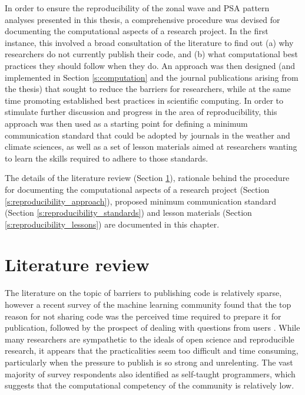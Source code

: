 In order to ensure the reproducibility of the zonal wave and PSA pattern analyses presented in this thesis, a comprehensive procedure was devised for documenting the computational aspects of a research project. In the first instance, this involved a broad consultation of the literature to find out (a) why researchers do not currently publish their code, and (b) what computational best practices they should follow when they do. An approach was then designed (and implemented in Section \ref{s:computation} and the journal publications arising from the thesis) that sought to reduce the barriers for researchers, while at the same time promoting established best practices in scientific computing. In order to stimulate further discussion and progress in the area of reproducibility, this approach was then used as a starting point for defining a minimum communication standard that could be adopted by journals in the weather and climate sciences, as well as a set of lesson materials aimed at researchers wanting to learn the skills required to adhere to those standards. 

The details of the literature review (Section \ref{s:reproducibility_review}), rationale behind the procedure for documenting the computational aspects of a research project (Section \ref{s:reproducibility_approach}), proposed minimum communication standard (Section \ref{s:reproducibility_standards}) and lesson materials (Section \ref{s:reproducibility_lessons}) are documented in this chapter.



\section{Literature review}\label{s:reproducibility_review}

The literature on the topic of barriers to publishing code is relatively sparse, however a recent survey of the machine learning community found that the top reason for not sharing code was the perceived time required to prepare it for publication, followed by the prospect of dealing with questions from users \citep{Stodden2010}. While many researchers are sympathetic to the ideals of open science and reproducible research, it appears that the practicalities seem too difficult and time consuming, particularly when the pressure to publish is so strong and unrelenting. The vast majority of survey respondents also identified as self-taught programmers, which suggests that the computational competency of the community is relatively low. 

